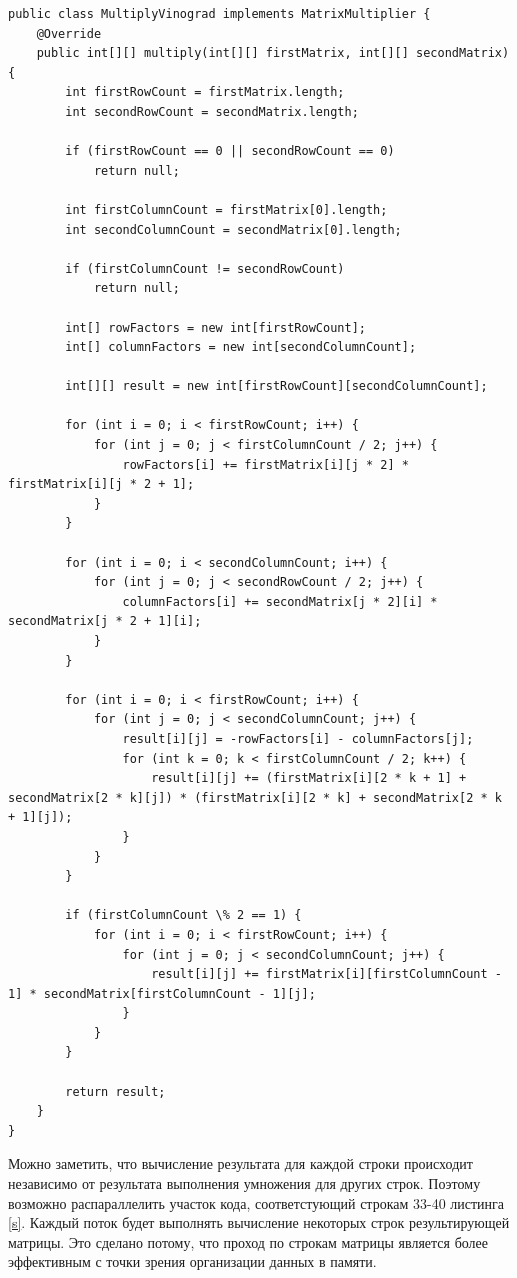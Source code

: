\documentclass[12pt]{report}
\begin{document}
\begin{lstlisting}[label=s,caption=Стандартный алгоритм Винограда]
public class MultiplyVinograd implements MatrixMultiplier {
    @Override
    public int[][] multiply(int[][] firstMatrix, int[][] secondMatrix) {
        int firstRowCount = firstMatrix.length;
        int secondRowCount = secondMatrix.length;

        if (firstRowCount == 0 || secondRowCount == 0)
            return null;

        int firstColumnCount = firstMatrix[0].length;
        int secondColumnCount = secondMatrix[0].length;

        if (firstColumnCount != secondRowCount)
            return null;

        int[] rowFactors = new int[firstRowCount];
        int[] columnFactors = new int[secondColumnCount];

        int[][] result = new int[firstRowCount][secondColumnCount];

        for (int i = 0; i < firstRowCount; i++) {
            for (int j = 0; j < firstColumnCount / 2; j++) {
                rowFactors[i] += firstMatrix[i][j * 2] * firstMatrix[i][j * 2 + 1];
            }
        }

        for (int i = 0; i < secondColumnCount; i++) {
            for (int j = 0; j < secondRowCount / 2; j++) {
                columnFactors[i] += secondMatrix[j * 2][i] * secondMatrix[j * 2 + 1][i];
            }
        }

        for (int i = 0; i < firstRowCount; i++) {
            for (int j = 0; j < secondColumnCount; j++) {
                result[i][j] = -rowFactors[i] - columnFactors[j];
                for (int k = 0; k < firstColumnCount / 2; k++) {
                    result[i][j] += (firstMatrix[i][2 * k + 1] + secondMatrix[2 * k][j]) * (firstMatrix[i][2 * k] + secondMatrix[2 * k + 1][j]);
                }
            }
        }

        if (firstColumnCount \% 2 == 1) {
            for (int i = 0; i < firstRowCount; i++) {
                for (int j = 0; j < secondColumnCount; j++) {
                    result[i][j] += firstMatrix[i][firstColumnCount - 1] * secondMatrix[firstColumnCount - 1][j];
                }
            }
        }

        return result;
    }
}
\end{lstlisting}



	
	Можно заметить, что вычисление результата для каждой строки происходит независимо от результата выполнения умножения для других строк. Поэтому возможно распараллелить участок кода, соответстующий строкам 33-40 листинга \ref{s}. Каждый поток будет выполнять вычисление некоторых строк результирующей матрицы. Это сделано потому, что проход по строкам матрицы является более эффективным с точки зрения организации данных в памяти.
\end{document}
